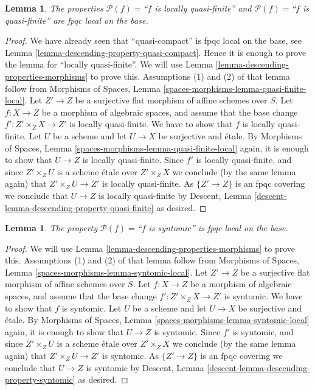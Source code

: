 \documentclass{stacks-project}
\theoremstyle{plain}
\newtheorem{lemma}[subsection]{Lemma}
\theoremstyle{definition}
\theoremstyle{remark}
\numberwithin{equation}{subsection}
\begin{document}
\begin{lemma}
\label{lemma-descending-property-quasi-finite}
The properties
$\mathcal{P}(f) =$``$f$ is locally quasi-finite''
and
$\mathcal{P}(f) =$``$f$ is quasi-finite''
are fpqc local on the base.
\end{lemma}

\begin{proof}
We have already seen that ``quasi-compact'' is fpqc local on the base, see
Lemma \ref{lemma-descending-property-quasi-compact}. Hence it is enough
to prove the lemma for ``locally quasi-finite''. We will use
Lemma \ref{lemma-descending-properties-morphisms}
to prove this. Assumptions (1) and (2) of that lemma follow from
Morphisms of Spaces,
Lemma \ref{spaces-morphisms-lemma-quasi-finite-local}.
Let $Z' \to Z$ be a surjective flat morphism of affine schemes over $S$.
Let $f : X \to Z$ be a morphism of algebraic spaces, and assume
that the base change $f' : Z' \times_Z X \to Z'$ is locally quasi-finite.
We have to show that $f$ is locally quasi-finite. Let $U$ be a scheme
and let $U \to X$ be surjective and \'etale. By
Morphisms of Spaces,
Lemma \ref{spaces-morphisms-lemma-quasi-finite-local}
again, it is enough to show that $U \to Z$ is locally quasi-finite.
Since $f'$ is locally quasi-finite, and since $Z' \times_Z U$ is a
scheme \'etale over $Z' \times_Z X$ we conclude (by the same lemma again) that
$Z' \times_Z U \to Z'$ is locally quasi-finite.
As $\{Z' \to Z\}$ is an fpqc covering we conclude that
$U \to Z$ is locally quasi-finite by
Descent, Lemma \ref{descent-lemma-descending-property-quasi-finite}
as desired.
\end{proof}

\begin{lemma}
\label{lemma-descending-property-syntomic}
The property $\mathcal{P}(f) =$``$f$ is syntomic''
is fpqc local on the base.
\end{lemma}

\begin{proof}
We will use
Lemma \ref{lemma-descending-properties-morphisms}
to prove this. Assumptions (1) and (2) of that lemma follow from
Morphisms of Spaces,
Lemma \ref{spaces-morphisms-lemma-syntomic-local}.
Let $Z' \to Z$ be a surjective flat morphism of affine schemes over $S$.
Let $f : X \to Z$ be a morphism of algebraic spaces, and assume
that the base change $f' : Z' \times_Z X \to Z'$ is syntomic.
We have to show that $f$ is syntomic. Let $U$ be a scheme
and let $U \to X$ be surjective and \'etale. By
Morphisms of Spaces,
Lemma \ref{spaces-morphisms-lemma-syntomic-local}
again, it is enough to show that $U \to Z$ is syntomic.
Since $f'$ is syntomic, and since $Z' \times_Z U$ is a
scheme \'etale over $Z' \times_Z X$ we conclude (by the same lemma again) that
$Z' \times_Z U \to Z'$ is syntomic.
As $\{Z' \to Z\}$ is an fpqc covering we conclude that
$U \to Z$ is syntomic by
Descent, Lemma \ref{descent-lemma-descending-property-syntomic}
as desired.
\end{proof}
\end{document}
